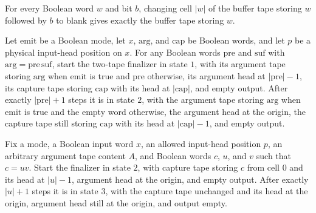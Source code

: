 \begin{lemma}
\label{Turing.FinTM.emCall_erase_last}
\leanok
{}
For every Boolean word $w$ and bit $b$, changing cell $|w|$ of the buffer tape storing
$w$ followed by $b$ to blank gives exactly the buffer tape storing $w$.
\end{lemma}

\begin{lemma}
\label{Turing.FinTM.emCall_finish_arg}
\leanok
{}
Let $\mathrm{emit}$ be a Boolean mode, let $x$, $\mathrm{arg}$, and $\mathrm{cap}$ be
Boolean words, and let $p$ be a physical input-head position on $x$. For any Boolean
words $\mathrm{pre}$ and $\mathrm{suf}$ with $\mathrm{arg}=\mathrm{pre}\,\mathrm{suf}$,
start the two-tape finalizer in state $1$, with its argument tape storing $\mathrm{arg}$
when $\mathrm{emit}$ is true and $\mathrm{pre}$ otherwise, its argument head at
$|\mathrm{pre}|-1$, its capture tape storing $\mathrm{cap}$ with its head at
$|\mathrm{cap}|$, and empty output. After exactly $|\mathrm{pre}|+1$ steps it is in
state $2$, with the argument tape storing $\mathrm{arg}$ when $\mathrm{emit}$ is true
and the empty word otherwise, the argument head at the origin, the capture tape still
storing $\mathrm{cap}$ with its head at $|\mathrm{cap}|-1$, and empty output.
\end{lemma}

\begin{lemma}
\label{Turing.FinTM.emCall_finish_rewind}
\leanok
{}
Fix a mode, a Boolean input word $x$, an allowed input-head position $p$, an arbitrary
argument tape content $A$, and Boolean words $c$, $u$, and $v$ such that $c=uv$. Start
the finalizer in state $2$, with capture tape storing $c$ from cell $0$ and its head at
$|u|-1$, argument head at the origin, and empty output. After exactly $|u|+1$ steps it
is in state $3$, with the capture tape unchanged and its head at the origin, argument
head still at the origin, and output empty.
\end{lemma}

